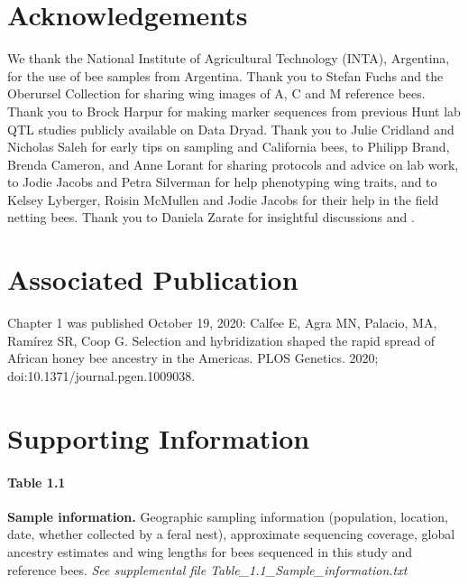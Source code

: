 \section*{Acknowledgements}
We thank the National Institute of Agricultural Technology (INTA), Argentina, for the use of bee samples from Argentina. Thank you to Stefan Fuchs and the Oberursel Collection for sharing wing images of A, C and M reference bees. Thank you to Brock Harpur for making marker sequences from previous Hunt lab QTL studies publicly available on Data Dryad. Thank you to Julie Cridland and Nicholas Saleh for early tips on sampling and California bees, to Philipp Brand, Brenda Cameron, and Anne Lorant for sharing protocols and advice on lab work, to Jodie Jacobs and Petra Silverman for help phenotyping wing traits, and to Kelsey Lyberger, Roisin McMullen and Jodie Jacobs for their help in the field netting bees.  Thank you to Daniela Zarate for insightful discussions and .

\section*{Associated Publication}
Chapter 1 was published October 19, 2020: \newline
Calfee E, Agra MN, Palacio, MA, Ramírez SR, Coop G. Selection and hybridization shaped the rapid spread of African honey bee ancestry in the Americas. PLOS Genetics. 2020; \\doi:10.1371/journal.pgen.1009038.

\medskip

%


%

\newpage
\section*{Supporting Information}

\paragraph*{Table 1.1}
\label{table_bee_gps}
{\bf Sample information.} Geographic sampling information (population, location, date, whether collected by a feral nest), approximate sequencing coverage, global ancestry estimates and wing lengths for bees sequenced in this study and reference bees. \textit{See supplemental file Table\_1.1\_Sample\_information.txt}
\newpage



